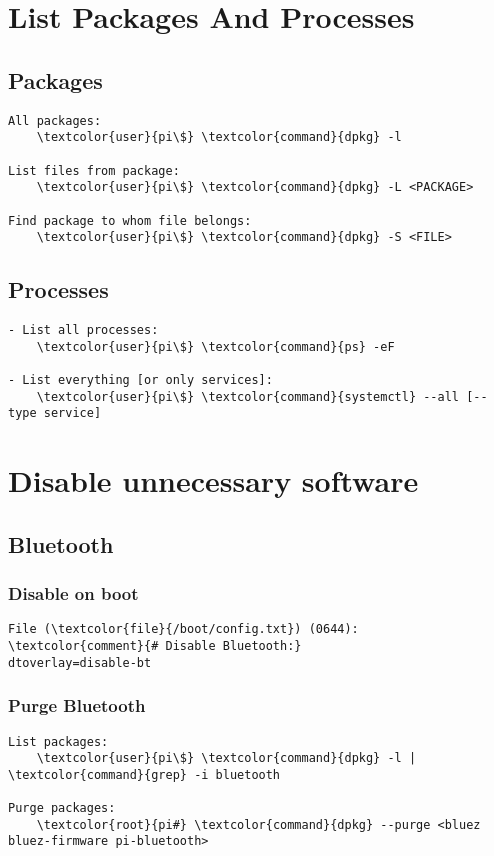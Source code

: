 \documentclass[10pt, a4paper, onecolumn, openany]{book} %
\begin{document}

\section{List Packages And Processes}
\subsection{Packages}
\begin{Verbatim}[commandchars=\\\{\}]
All packages:
    \textcolor{user}{pi\$} \textcolor{command}{dpkg} -l
    
List files from package:
    \textcolor{user}{pi\$} \textcolor{command}{dpkg} -L <PACKAGE>
    
Find package to whom file belongs:
    \textcolor{user}{pi\$} \textcolor{command}{dpkg} -S <FILE>
\end{Verbatim}

\subsection{Processes}
\begin{Verbatim}[commandchars=\\\{\}]
- List all processes:
    \textcolor{user}{pi\$} \textcolor{command}{ps} -eF
    
- List everything [or only services]:
    \textcolor{user}{pi\$} \textcolor{command}{systemctl} --all [--type service]
\end{Verbatim}



\section{Disable unnecessary software}
\subsection{Bluetooth}
\subsubsection{Disable on boot}
\begin{Verbatim}[commandchars=\\\{\}]
File (\textcolor{file}{/boot/config.txt}) (0644):
\textcolor{comment}{# Disable Bluetooth:}
dtoverlay=disable-bt
\end{Verbatim}
\subsubsection{Purge Bluetooth}
\begin{Verbatim}[commandchars=\\\{\}]
List packages:
    \textcolor{user}{pi\$} \textcolor{command}{dpkg} -l | \textcolor{command}{grep} -i bluetooth

Purge packages:
    \textcolor{root}{pi#} \textcolor{command}{dpkg} --purge <bluez bluez-firmware pi-bluetooth>
\end{Verbatim}
\end{document}
